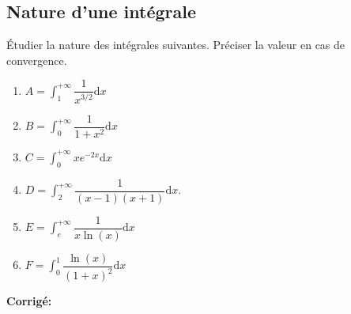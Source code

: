 \documentclass[a4paper,twoside,french,10pt]{VcCours}
\newcommand{\dx}{\text{d}x}
\newcommand{\corr}{\textbf{Corrigé:}}
\begin{document}

\tableofcontents
\separationTitre



\subsection{Nature d'une intégrale}


\medskip

\begin{Exercice}{} Étudier la nature des intégrales suivantes. Préciser la valeur en cas de convergence.

\begin{multicols}{2}
\begin{enumerate}
\item $A = \int_1^{+ \infty} \dfrac{1}{x^{3/2}} \dx$
\item $B = \int_0^{+ \infty} \dfrac{1}{1+x^2} \dx$
\item $C = \int_0^{+ \infty} x e^{-2x} \dx$
\item $D= \int_2^{+ \infty} \dfrac{1}{(x-1)(x+1)} \dx$.
\item $E= \int_{e}^{+ \infty} \dfrac{1}{x\ln(x)} \dx$
\item $F= \int_0^1 \dfrac{\ln(x)}{(1+x)^2} \dx$
\end{enumerate}
\end{multicols}
\vspace{0.1cm}
\end{Exercice}

\corr 
\end{document}

